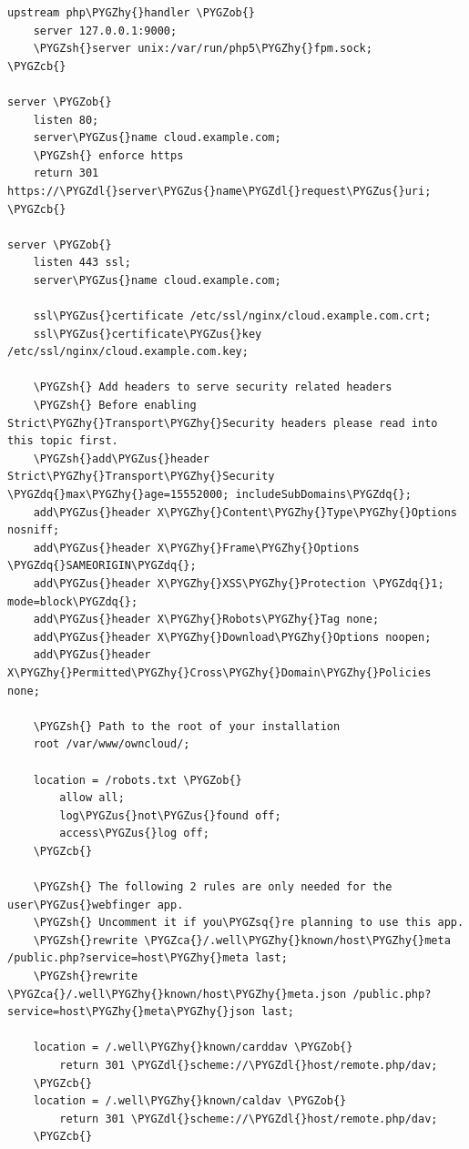 \documentclass[letterpaper,10pt,english]{sphinxmanual}
\def\PYGZus{\char`\_}
\def\PYGZob{\char`\{}
\def\PYGZcb{\char`\}}
\def\PYGZca{\char`\^}
\def\PYGZsh{\char`\#}
\def\PYGZdl{\char`\$}
\def\PYGZhy{\char`\-}
\def\PYGZsq{\char`\'}
\def\PYGZdq{\char`\"}
\renewcommand\PYGZsq{\textquotesingle}
\begin{document}
\begin{Verbatim}[commandchars=\\\{\}]
upstream php\PYGZhy{}handler \PYGZob{}
    server 127.0.0.1:9000;
    \PYGZsh{}server unix:/var/run/php5\PYGZhy{}fpm.sock;
\PYGZcb{}

server \PYGZob{}
    listen 80;
    server\PYGZus{}name cloud.example.com;
    \PYGZsh{} enforce https
    return 301 https://\PYGZdl{}server\PYGZus{}name\PYGZdl{}request\PYGZus{}uri;
\PYGZcb{}

server \PYGZob{}
    listen 443 ssl;
    server\PYGZus{}name cloud.example.com;

    ssl\PYGZus{}certificate /etc/ssl/nginx/cloud.example.com.crt;
    ssl\PYGZus{}certificate\PYGZus{}key /etc/ssl/nginx/cloud.example.com.key;

    \PYGZsh{} Add headers to serve security related headers
    \PYGZsh{} Before enabling Strict\PYGZhy{}Transport\PYGZhy{}Security headers please read into this topic first.
    \PYGZsh{}add\PYGZus{}header Strict\PYGZhy{}Transport\PYGZhy{}Security \PYGZdq{}max\PYGZhy{}age=15552000; includeSubDomains\PYGZdq{};
    add\PYGZus{}header X\PYGZhy{}Content\PYGZhy{}Type\PYGZhy{}Options nosniff;
    add\PYGZus{}header X\PYGZhy{}Frame\PYGZhy{}Options \PYGZdq{}SAMEORIGIN\PYGZdq{};
    add\PYGZus{}header X\PYGZhy{}XSS\PYGZhy{}Protection \PYGZdq{}1; mode=block\PYGZdq{};
    add\PYGZus{}header X\PYGZhy{}Robots\PYGZhy{}Tag none;
    add\PYGZus{}header X\PYGZhy{}Download\PYGZhy{}Options noopen;
    add\PYGZus{}header X\PYGZhy{}Permitted\PYGZhy{}Cross\PYGZhy{}Domain\PYGZhy{}Policies none;

    \PYGZsh{} Path to the root of your installation
    root /var/www/owncloud/;

    location = /robots.txt \PYGZob{}
        allow all;
        log\PYGZus{}not\PYGZus{}found off;
        access\PYGZus{}log off;
    \PYGZcb{}

    \PYGZsh{} The following 2 rules are only needed for the user\PYGZus{}webfinger app.
    \PYGZsh{} Uncomment it if you\PYGZsq{}re planning to use this app.
    \PYGZsh{}rewrite \PYGZca{}/.well\PYGZhy{}known/host\PYGZhy{}meta /public.php?service=host\PYGZhy{}meta last;
    \PYGZsh{}rewrite \PYGZca{}/.well\PYGZhy{}known/host\PYGZhy{}meta.json /public.php?service=host\PYGZhy{}meta\PYGZhy{}json last;

    location = /.well\PYGZhy{}known/carddav \PYGZob{}
        return 301 \PYGZdl{}scheme://\PYGZdl{}host/remote.php/dav;
    \PYGZcb{}
    location = /.well\PYGZhy{}known/caldav \PYGZob{}
        return 301 \PYGZdl{}scheme://\PYGZdl{}host/remote.php/dav;
    \PYGZcb{}


\end{Verbatim}
\end{document}
